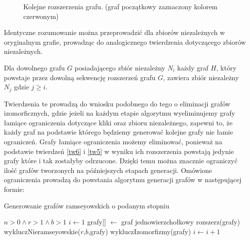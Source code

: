 \begin{figure}[H]
{\begin{tikzpicture}[node distance={15mm}, main/.style = {draw, circle}]
		\end{tikzpicture}
		}
		\hspace{15mm}
   		\caption{Kolejne rozszerzenia grafu. (graf początkowy zaznaczony kolorem czerwonym)}
   		\label{rozszerzeniekliki}
\end{figure}
Identyczne rozumowanie można przeprowadzić dla zbiorów niezależnych w oryginalnym grafie, prowadząc do analogicznego twierdzenia dotyczącego zbiorów niezależnych.
\begin{theorem}
Dla dowolnego grafu $G$ posiadającego zbiór niezależny $N_i$ każdy graf $H$, który powstaje przez dowolną sekwencję rozszerzeń grafu $G$, zawiera zbiór niezależny $N_j$ gdzie $j \geq i$.
\label{tw6}
\end{theorem}
Twierdzenia te prowadzą do wniosku podobnego do tego o eliminacji grafów izomorficznych, gdzie jeżeli na każdym etapie algorytmu wyeliminujemy grafy łamiące ograniczenia dotyczące kliki oraz zbioru niezależnego, zapewni to, że każdy graf na podstawie którego będziemy generować kolejne grafy nie łamie ograniczeń. Grafy łamiące ograniczenia możemy eliminować, ponieważ na podstawie twierdzeń \ref{tw6} i \ref{tw5} w wyniku ich rozszerzenia powstają jedynie grafy które i tak zostałyby odrzucone. Dzięki temu można znacznie ograniczyć ilość grafów tworzonych na późniejszych etapach generacji. 
Omówione ograniczenia prowadzą do powstania algorytmu generacji grafów w następującej formie:

\begin{algorithm}[H]
  \caption{Generowanie grafów ramseyowskich o podanym stopniu}
  \begin{algorithmic}
  \REQUIRE $n > 0 \land r>1 \land b>1$
  \STATE $i \gets 1$
  \STATE grafy[] $\gets$ graf jednowierzchołkowy 
    \STATE rozszerz(grafy)
    \STATE wykluczNieramseyowskie($r$,$b$,grafy)
    \STATE wykluczIzomorfizmy(grafy)
    \STATE $i \gets i + 1$
  \ENDWHILE
  \end{algorithmic}
\end{algorithm}



